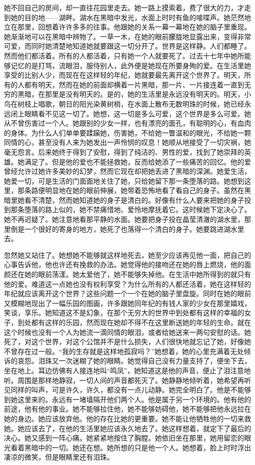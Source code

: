 \par 她不回自己的房间，却一直往花园里走去。她一路上摸索着，费了很大的力，才走到她的目的地——湖畔。湖水在黑暗中发光，水面上时时有鱼的唼喋声。她茫然地立在那里，回想着许许多多的往事。他跟她的关系一幕一幕地在她的脑子里重现。她渐渐地可以在黑暗中辨物了。一草一木，在她的眼前朦胧地显露出来，变得非常可爱，而同时她清楚地知道她就要跟这一切分开了。世界是这样静。人们都睡了。然而他们都活着。所有的人都活着，只有她一个人就要死了。过去十七年中她所能够记忆的是打骂，流眼泪，服侍别人，此外便是她现在所要身殉的爱。在生活里她享受的比别人少，而现在在这样轻的年纪，她就要最先离开这个世界了。明天，所有的人都有明天，然而在她的前面却横着一片黑暗，那一片、一片接连着一直到无穷的黑暗，在那里是没有明天的。是的，她的生活里是永远没有明天的。明天，小鸟在树枝上唱歌，朝日的阳光染黄树梢，在水面上散布无数明珠的时候，她已经永远闭上眼睛看不见这一切了。她想，这一切是多么可爱，这个世界是多么可爱。她从不曾伤害过一个人。她跟别的少女一样，也有漂亮的面孔，有聪明的心，有血肉的身体。为什么人们单单要蹂躏她，伤害她，不给她一瞥温和的眼光，不给她一颗同情的心，甚至没有人来为她发出一声怜悯的叹息！她顺从地接受了一切灾祸，她毫无怨言。后来她终于得到了安慰，得到了纯洁的、男性的爱，找到了她崇拜的英雄。她满足了。但是他的爱也不能拯救她，反而给她添了一些痛苦的回忆。他的爱曾经允许过她许多美妙的幻梦，然而它现在却把她丢进了黑暗的深渊。她爱生活，她爱一切，可是生活的门面面地关住了她，只给她留下那一条堕落的路。她想到这里，那条路便明显地在她的眼前伸展，她带着恐怖地看了看自己的身子。虽然在黑暗里她看不清楚，然而她知道她的身子是清白的。好像有什么人要来把她的身子投到那条堕落的路上似的，她不禁痛惜地、爱怜地摩抚着它。这时候她下定决心了。她不再迟疑了。她注意地看那平静的水面。她要把身子投在晶莹清澈的湖水里，那里倒是一个很好的寄身的地方，她死了也落得一个清白的身子。她要跳进湖水里去。
\par 忽然她又站住了。她想她不能够就这样地死去，她至少应该再见他一面，把自己的心事告诉他，他也许还有挽救的办法。她觉得他的接吻还在她的唇上燃烧，他的面颜还在她的眼前荡漾。她太爱他了，她不能够失掉他。在生活中她所得到的就只有他的爱。难道这一点她也没有权利享受？为什么所有的人都还活着，她在这样轻的年纪就应该离开这个世界？这些问题一个一个在她的脑子里盘旋。同时在她的眼前又模糊地现出了一幅乐园的图画，许多跟她同年纪的有钱人家的少女在那里嬉戏，笑谈，享乐。她知道这不是幻象，在那个无穷大的世界中到处都有这样的幸福的女子，到处都有这样的乐园，然而现在她却不得不在这里断送她的年轻的生命。就在这个时候也没有一个人为她流一滴同情的眼泪，或者给她送来一两句安慰的话。她死了，对这个世界，对这个公馆并不是什么损失，人们很快地就忘记了她，好像她不曾存在过一般。“我的生存就是这样地孤寂吗？”她想着，她的心里充满着无处倾诉的哀怨。泪珠又一次迷糊了她的眼睛。她觉得自己没有力量支持了，便坐下去，坐在地上。耳边仿佛有人接连地叫“鸣凤”，她知道这是他的声音，便止了泪注意地听。周围是那样地静寂，一切人间的声音都死灭了。她静静地倾听着，她希望再听见同样的叫声，可是许久，许久，都没有一点儿动静。她完全明白了。他是不能够到她这里来的。永远有一堵墙隔开他们两个人。他是属于另一个环境的。他有他的前途，他有他的事业。她不能够拉住他，她不能够妨碍他，她不能够把他永远拉在她的身边。她应该放弃他。他的存在比她的更重要。她不能让他牺牲他的一切来救她。她应该去了，在他的生活里她应该永久地去了。她这样想着，就定下了最后的决心。她又感到一阵心痛。她紧紧地按住了胸膛。她依旧坐在那里，她用留恋的眼光看着黑暗中的一切。她还在想。她所想的只是他一个人。她想着，脸上时时浮出凄凉的微笑，但是眼睛里还有泪珠。
